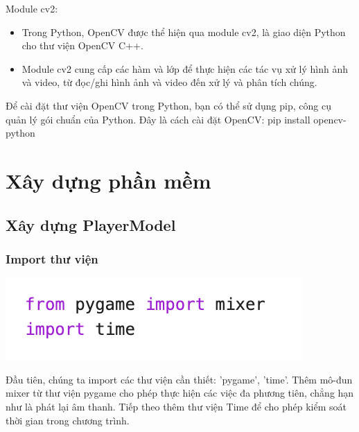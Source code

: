 \documentclass[a4paper]{article}
\begin{document}
    \hspace*{0.5cm} Module cv2:
    \begin{itemize}
        \item Trong Python, OpenCV được thể hiện qua module cv2, là giao diện Python cho thư viện OpenCV C++.
        \item Module cv2 cung cấp các hàm và lớp để thực hiện các tác vụ xử lý hình ảnh và video, từ đọc/ghi hình ảnh và video đến xử lý và phân tích chúng.
    \end{itemize}

    \hspace*{0.5cm} Để cài đặt thư viện OpenCV trong Python, bạn có thể sử dụng pip, công cụ quản lý gói chuẩn của Python. Đây là cách cài đặt OpenCV: pip install opencv-python
    
\newpage
\section{Xây dựng phần mềm}
\subsection{Xây dựng PlayerModel}
\subsubsection{Import thư viện}
\begin{center}
\includegraphics[width=1\linewidth]{template_SGU 2/ImportLibary_Model.png}
\end{center}
\hspace*{0.5cm}Đầu tiên, chúng ta import các thư viện cần thiết: 'pygame', 'time'. Thêm mô-đun mixer từ thư viện pygame cho phép thực hiện các việc đa phương tiên, chẳng hạn như là phát lại âm thanh. Tiếp theo thêm thư viện Time để cho phép kiểm soát thời gian trong chương trình.
\end{document}

